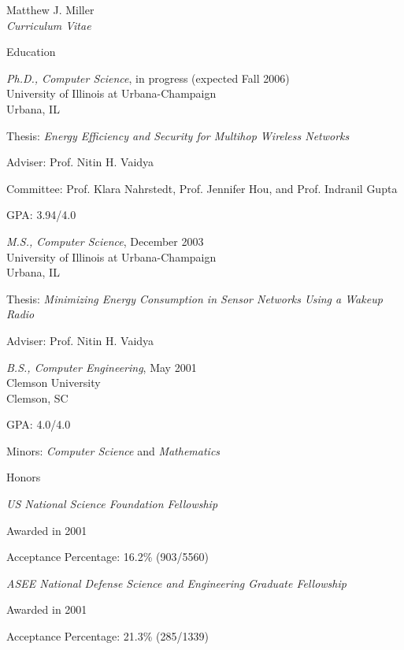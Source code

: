 \documentclass[10pt]{article}
\newenvironment{sublist}{%
	\begin{list}{}{%
		\setlength{\itemsep}{0em}\setlength{\parsep}{0em}%
		\setlength{\topsep}{0em}\setlength{\parskip}{0em}%
	}%
}%
{ \end{list} }
\begin{document}
\begin{cv}{Matthew J. Miller\\{\large \itshape Curriculum Vitae}}
\begin{cvlist}{Education}
	\item \emph{Ph.D., Computer Science}, in progress (expected Fall
	2006)\\
	University of Illinois at Urbana-Champaign\\
	Urbana, IL
	\begin{sublist}
		\item Thesis: \textit{Energy Efficiency and Security
		for Multihop Wireless Networks}
		\item Adviser: Prof. Nitin H. Vaidya
		\item Committee: Prof. Klara Nahrstedt, Prof. Jennifer Hou,
		and Prof. Indranil Gupta
		\item GPA: 3.94/4.0
	\end{sublist}
	\item \emph{M.S., Computer Science}, December 2003\\ 
	University of Illinois at Urbana-Champaign\\
	Urbana, IL
	\begin{sublist}
		\item Thesis: \textit{Minimizing Energy Consumption in Sensor
		Networks Using a Wakeup Radio}
		\item Adviser: Prof. Nitin H. Vaidya
	\end{sublist}
	\item \emph{B.S., Computer Engineering}, May 2001\\
	Clemson University\\
	Clemson, SC
	\begin{sublist}
		\item GPA: 4.0/4.0
		\item Minors: \emph{Computer Science} and \emph{Mathematics}
	\end{sublist}
\end{cvlist}

\begin{cvlist}{Honors}
\item
	\emph{US National Science Foundation Fellowship}
	\begin{sublist}
	\item Awarded in 2001
	\item Acceptance Percentage: 16.2\% (903/5560)
	\end{sublist}
\item
	\emph{ASEE National Defense Science and 
	Engineering Graduate Fellowship}
	\begin{sublist}
	\item Awarded in 2001
	\item Acceptance Percentage: 21.3\% (285/1339)
	\end{sublist}
\end{cvlist}


\end{cv}
\end{document}
